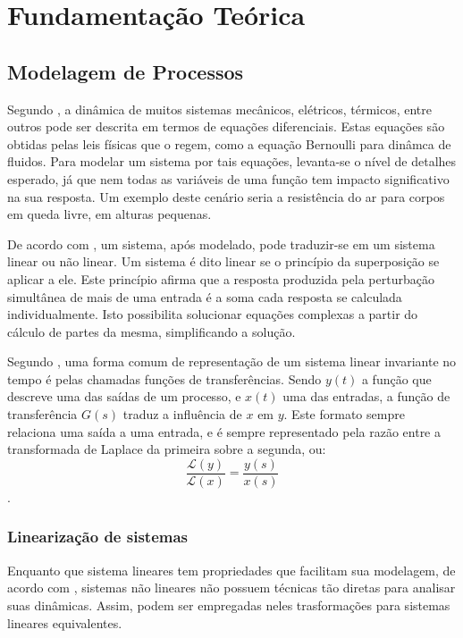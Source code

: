 \chapter{Fundamentação Teórica}

\section{Modelagem de Processos}

Segundo , a dinâmica de muitos sistemas mecânicos, elétricos, térmicos, entre outros pode ser descrita em termos de equações diferenciais. Estas equações são obtidas pelas leis físicas que o regem, como a equação Bernoulli para dinâmca de fluidos. Para modelar um sistema por tais equações, levanta-se o nível de detalhes esperado, já que nem todas as variáveis de uma função tem impacto significativo na sua resposta. Um exemplo deste cenário seria a resistência do ar para corpos em queda livre, em alturas pequenas.

De acordo com , um sistema, após modelado, pode traduzir-se em um sistema linear ou não linear. Um sistema é dito linear se o princípio da superposição se aplicar a ele. Este princípio afirma que a resposta produzida pela perturbação simultânea de mais de uma entrada é a soma cada resposta se calculada individualmente. Isto possibilita solucionar equações complexas a partir do cálculo de partes da mesma, simplificando a solução.

Segundo , uma forma comum de representação de um sistema linear invariante no tempo é pelas chamadas funções de transferências. Sendo $y(t)$ a função que descreve uma das saídas de um processo, e $x(t)$ uma das entradas, a função de transferência $G(s)$ traduz a influência de $x$ em $y$. Este formato sempre relaciona uma saída a uma entrada, e é sempre representado pela razão entre a transformada de Laplace da primeira sobre a segunda, ou:
\begin{equation}
\frac{\mathcal{L}(y)}{\mathcal{L}(x)} = \frac{y{(s)}}{x(s)}
\end{equation}.

\subsection{Linearização de sistemas}

Enquanto que sistema lineares tem propriedades que facilitam sua modelagem, de acordo com , sistemas não lineares não possuem técnicas tão diretas para analisar suas dinâmicas. Assim, podem ser empregadas neles trasformações para sistemas lineares equivalentes.

